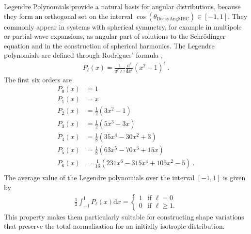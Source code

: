 Legendre Polynomials provide a natural basis for angular distributions, because they form an orthogonal set on the interval $\cos(\theta_\text{DecayAngMEC}) \in [-1,1]$. They commonly appear in systems with spherical symmetry, for example in multipole or partial-wave expansions, as angular part of solutions to the Schr\"odinger equation and in the construction of spherical harmonics.
The Legendre polynomials are defined through Rodrigues' formula \cite{Rodrigues1816},
%
\begin{align} \label{eq:LegendrePoly_def}
    P_\ell (x) = \frac{1}{2^\ell \ell!} \frac{\text{d}^\ell}{\text{d}x^\ell} (x^2 - 1)^\ell \ \text{.}
\end{align}
%
The first six orders are
%
\begin{align} \label{eq:LegendrePoly_explicite}
    P_0 (x) &= 1 \\
    P_1 (x) &= x \\
    P_2 (x) &= \frac{1}{2} (3x^2 - 1) \\
    P_3 (x) &= \frac{1}{2} (5 x^3 - 3x) \\
    P_4 (x) &= \frac{1}{8} (35 x^4 - 30x^2 + 3) \\
    P_5 (x) &= \frac{1}{8} (63 x^5 - 70x^3 + 15x) \\
    P_6 (x) &= \frac{1}{16} (231 x^6 - 315x^4 + 105 x^2 - 5) \ \text{.} \\
\end{align}
%
The average value of the Legendre polynomials over the interval $[-1,1]$ is given by
%
\begin{align} \label{eq:LegendrePoly_avg}
    \frac{1}{2} \int_{-1}^1 P_\ell(x)\mathrm{d}x =
    \begin{cases}
        1 & \text{if } \ell = 0 \\
        0 & \text{if } \ell \geq 1 \text{.}
    \end{cases}
\end{align}
%
This property makes them particularly suitable for constructing shape variations that preserve the total normalisation for an initially isotropic distribution.

